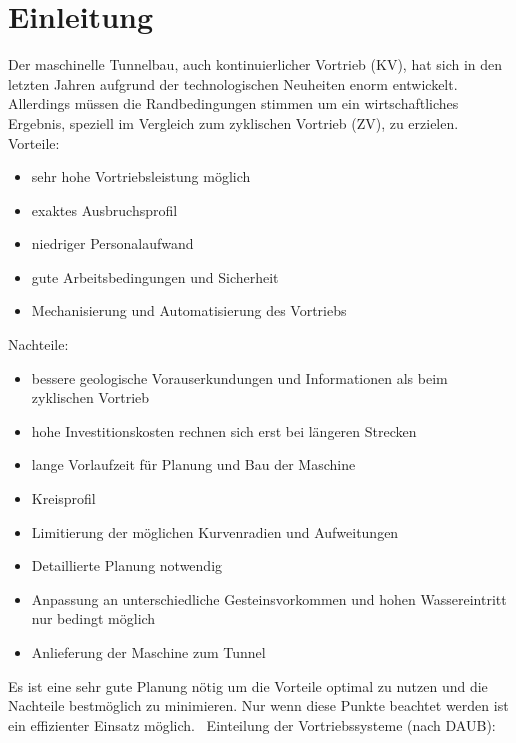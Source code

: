 \chapter{Einleitung}
Der maschinelle Tunnelbau, auch kontinuierlicher Vortrieb (KV), hat sich in den letzten Jahren aufgrund der technologischen Neuheiten enorm entwickelt. Allerdings müssen die Randbedingungen stimmen um ein wirtschaftliches Ergebnis, speziell im Vergleich zum zyklischen Vortrieb (ZV), zu erzielen.
\\
Vorteile:
\begin{itemize}
\item sehr hohe Vortriebsleistung möglich
\item exaktes Ausbruchsprofil
\item niedriger Personalaufwand
\item gute Arbeitsbedingungen und Sicherheit
\item Mechanisierung und Automatisierung des Vortriebs
\end{itemize}
Nachteile:
\begin{itemize}
\item bessere geologische Vorauserkundungen und Informationen als beim zyklischen Vortrieb
\item hohe Investitionskosten rechnen sich erst bei längeren Strecken
\item lange Vorlaufzeit für Planung und Bau der Maschine
\item Kreisprofil
\item Limitierung der möglichen Kurvenradien und Aufweitungen
\item Detaillierte Planung notwendig
\item Anpassung an unterschiedliche Gesteinsvorkommen und hohen Wassereintritt nur bedingt möglich
\item Anlieferung der Maschine zum Tunnel
\end{itemize}
Es ist eine sehr gute Planung nötig um die Vorteile optimal zu nutzen und die Nachteile bestmöglich zu minimieren. Nur wenn diese Punkte beachtet werden ist ein effizienter Einsatz möglich.
\
Einteilung der Vortriebssysteme (nach DAUB):
